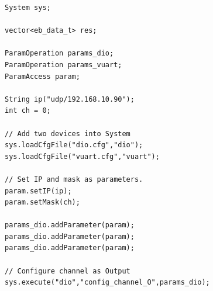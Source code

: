 

\begin{lstlisting}[frame=single, label=config_file_example1a, caption=Example of CALoE API]
System sys;

vector<eb_data_t> res;

ParamOperation params_dio;
ParamOperation params_vuart;
ParamAccess param;

String ip("udp/192.168.10.90");
int ch = 0;

// Add two devices into System
sys.loadCfgFile("dio.cfg","dio");
sys.loadCfgFile("vuart.cfg","vuart");
	
// Set IP and mask as parameters.
param.setIP(ip);
param.setMask(ch);

params_dio.addParameter(param);
params_dio.addParameter(param);
params_dio.addParameter(param);

// Configure channel as Output
sys.execute("dio","config_channel_O",params_dio);
\end{lstlisting}

